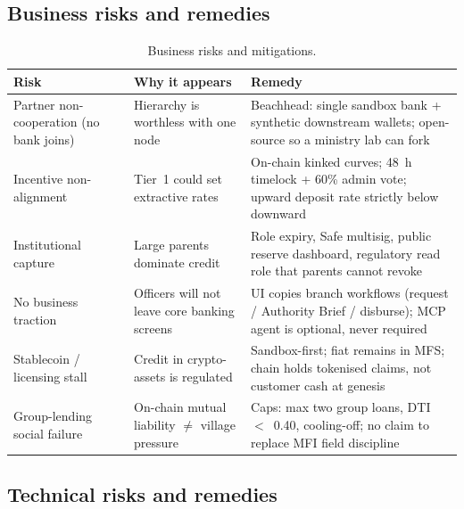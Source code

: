 \documentclass[11pt,a4paper]{article}
\newcommand{\tablehead}{\rowcolor{HeadShade}\bfseries}
\begin{document}
\subsection{Business risks and remedies}

\begin{table}[H]
\centering
\small
\caption{Business risks and mitigations.}
\label{tab:bizrisk}
\begin{tabular}{@{}>{\raggedright\arraybackslash}p{3.0cm}>{\raggedright\arraybackslash}p{5.2cm}>{\raggedright\arraybackslash}p{5.6cm}@{}}
\toprule
\tablehead Risk & Why it appears & Remedy \\
\midrule
Partner non-cooperation (no bank joins) & Hierarchy is worthless with one node & Beachhead: single sandbox bank + synthetic downstream wallets; open-source so a ministry lab can fork \\
\rowcolor{RowShade}
Incentive non-alignment & Tier~1 could set extractive rates & On-chain kinked curves; 48~h timelock + 60\% admin vote; upward deposit rate strictly below downward \\
Institutional capture & Large parents dominate credit & Role expiry, Safe multisig, public reserve dashboard, regulatory read role that parents cannot revoke \\
\rowcolor{RowShade}
No business traction & Officers will not leave core banking screens & UI copies branch workflows (request / Authority Brief / disburse); MCP agent is optional, never required \\
Stablecoin / licensing stall & Credit in crypto-assets is regulated & Sandbox-first; fiat remains in MFS; chain holds tokenised claims, not customer cash at genesis \\
\rowcolor{RowShade}
Group-lending social failure & On-chain mutual liability $\neq$ village pressure & Caps: max two group loans, DTI~$<$~0.40, cooling-off; no claim to replace MFI field discipline \\
\bottomrule
\end{tabular}
\end{table}

\subsection{Technical risks and remedies}
\end{document}
